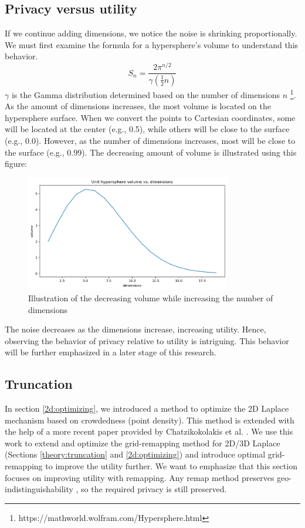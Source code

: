 \subsection{Privacy versus utility} \label{theory:privacy-utility-nd}
If we continue adding dimensions, we notice the noise is shrinking proportionally.
We must first examine the formula for a hypersphere’s volume to understand this behavior.
\begin{equation}
  S_n = \frac{2 \pi^{n/2}}{\gamma(\frac{1}{2}n)}
\end{equation}
$\gamma$ is the Gamma distribution determined based on the number of dimensions $n$ \footnote{https://mathworld.wolfram.com/Hypersphere.html}.
As the amount of dimensions increases, the most volume is located on the hypersphere surface.
When we convert the points to Cartesian coordinates, some will be located at the center (e.g., 0.5), while others will be close to the surface (e.g., 0.0).
However, as the number of dimensions increases, most will be close to the surface (e.g., 0.99).
The decreasing amount of volume is illustrated using this figure:
\begin{figure}[H]
  \includegraphics[width=0.8\textwidth]{TheorethicalFramework/ND-Laplace/Images/volume.png}
  \caption{Illustration of the decreasing volume while increasing the number of dimensions}
  \label{fig:curse-of-dimensionality}
\end{figure}

The noise decreases as the dimensions increase, increasing utility.
Hence, observing the behavior of privacy relative to utility is intriguing.
This behavior will be further emphasized in a later stage of this research.
\newpage
\subsection{Truncation}
In section \ref{2d:optimizing}, we introduced a method to optimize the 2D Laplace mechanism based on crowdedness (point density).
This method is extended with the help of a more recent paper provided by Chatzikokolakis et al. \citep{chatzikokolakis_efficient_2017}.
We use this work to extend and optimize the grid-remapping method for 2D/3D Laplace (Sections \ref{theory:truncation} and \ref{2d:optimizing}) and introduce optimal grid-remapping to improve the utility further.
We want to emphasize that this section focuses on improving utility with remapping.
Any remap method preserves geo-indistinguishability \cite{chatzikokolakis_efficient_2017}, so the required privacy is still preserved. \newline

